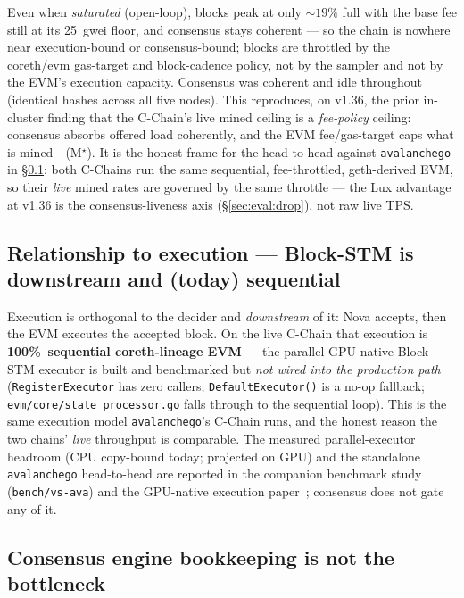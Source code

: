 \documentclass[11pt,a4paper]{article}
\newcommand{\Mprior}{M$^\star$}                      %
\begin{document}
Even when \emph{saturated} (open-loop), blocks peak at only \(\sim\!19\%\) full with the base
fee still at its \SI{25}{gwei} floor, and consensus stays coherent --- so the chain is
nowhere near execution-bound or consensus-bound; blocks are throttled by the coreth/evm
gas-target and block-cadence policy, not by the sampler and not by the EVM's execution
capacity. Consensus was coherent and idle throughout (identical hashes across all five nodes).
This reproduces, on v1.36, the prior in-cluster finding that the C-Chain's live mined ceiling
is a \emph{fee-policy} ceiling: consensus absorbs offered load coherently, and the EVM
fee/gas-target caps what is mined~\cite{luxquasarbench}~(\Mprior). It is the honest frame for
the head-to-head against \texttt{avalanchego} in \S\ref{sec:eval:exec}: both C-Chains run the
same sequential, fee-throttled, geth-derived EVM, so their \emph{live} mined rates are
governed by the same throttle --- the Lux advantage at v1.36 is the consensus-liveness axis
(\S\ref{sec:eval:drop}), not raw live TPS.

\subsection{Relationship to execution --- Block-STM is downstream and (today) sequential}
\label{sec:eval:exec}

Execution is orthogonal to the decider and \emph{downstream} of it: Nova accepts, then the EVM
executes the accepted block. On the live C-Chain that execution is \textbf{100\%\ sequential
coreth-lineage EVM} --- the parallel GPU-native Block-STM executor is built and benchmarked but
\emph{not wired into the production path} (\texttt{RegisterExecutor} has zero callers;
\texttt{DefaultExecutor()} is a no-op fallback;
\texttt{evm/core/state\_processor.go} falls through to the sequential loop). This is the same
execution model \texttt{avalanchego}'s C-Chain runs, and the honest reason the two chains'
\emph{live} throughput is comparable. The measured parallel-executor headroom (CPU
copy-bound today; projected on GPU) and the standalone \texttt{avalanchego} head-to-head are
reported in the companion benchmark study (\texttt{bench/vs-ava}) and the GPU-native execution
paper~\cite{gpubtps}; consensus does not gate any of it.

\subsection{Consensus engine bookkeeping is not the bottleneck}
\label{sec:eval:engine}
\end{document}
